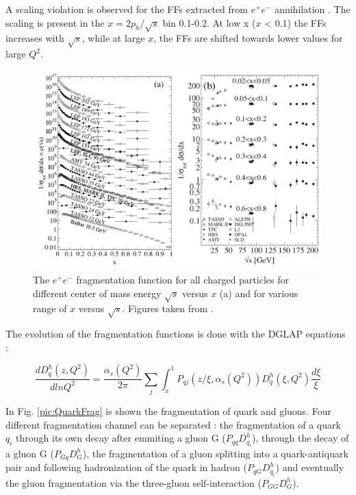 A scaling violation is observed for the FFs extracted from $e^+e^-$ annihilation \cite{SIAFF}. The scaling is present in the $x = 2p_h/\sqrt{s}$
bin 0.1-0.2. At low x ($x$ < 0.1) the FFs increases with $\sqrt{s}$, while at large $x$, the FFs are shifted towards lower values for large
$Q^2$.

\begin{figure}[!h]
  \centering
	\includegraphics[scale=0.6]{./gfx/FFscale.png}
	\caption{The $e^+ e^-$ fragmentation function for all charged particles for different center of mass energy $\sqrt{s}$ versus $x$ (a) and for various range of $x$ versus $\sqrt{s}$. Figures taken from \cite{PDG}.}
	\label{pic:FFscale}
\end{figure}

The evolution of the fragmentation functions is done with the DGLAP equations \cite{DGLAP} :

\begin{equation}
  \frac{dD_q^h(z,Q^2)}{dlnQ^2} = \frac{\alpha_s(Q^2)}{2\pi}\sum\limits_j\int_{x}^{1}P_{qj}\left(z/\xi,\alpha_s(Q^2)\right)D_q^h(\xi,Q^2)\frac{d\xi}{\xi}
\end{equation}

In Fig. \ref{pic:QuarkFrag} is shown the fragmentation of quark and gluons. Four different fragmentation channel can be separated : the fragmentation of a quark $q_i$ through its own decay after emmiting a gluon G ($P_{qq}D_{q_i}^h$), through the decay of a gluon G ($P_{Gq}D_{G}^h$), the fragmentation of a gluon splitting into a quark-antiquark pair and following hadronization of the quark in hadron ($P_{qG}D_{q_i}^h$) and eventually the gluon fragmentation via the three-gluon self-interaction ($P_{GG}D_{G}^h$).

